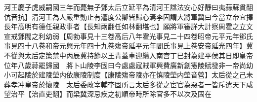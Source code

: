 河王慶子虎威嗣國三年而薨無子鄧太后立延平為清河王諡法安心好靜曰夷蒜蘇貫翻伉音抗】清河王為人嚴重動止有灋度公卿皆歸心焉李固謂大將軍冀曰今當立帝宜擇長年高明有德任親政事者【長知兩翻任如林翻堪也】願將軍審詳大計察周霍之立文宣戒鄧閻之利幼弱【周勃事見十三卷高后八年霍光事見二十四卷昭帝元平元年鄧氏事見四十八卷和帝元興元年四十九卷殤帝延平元年閻氏事見上卷安帝延光四年】冀不從與太后定策禁中丙辰冀持節以王青蓋車迎纘入南宫丁巳封為建平侯其日即皇帝位年八歲蒜罷歸國　將卜山陵李固曰今處處寇賊軍興費廣新創憲陵賦發非一帝尚幼小可起陵於建陵塋内依康陵制度【康陵殤帝陵亦在慎陵塋内塋音營】太后從之己未葬孝冲皇帝於懷陵　太后委政宰輔李固所言太后多從之宦官為惡者一皆斥遣天下咸望治平【治直吏翻】而梁冀深忌疾之初順帝時所除官多不以次及固在